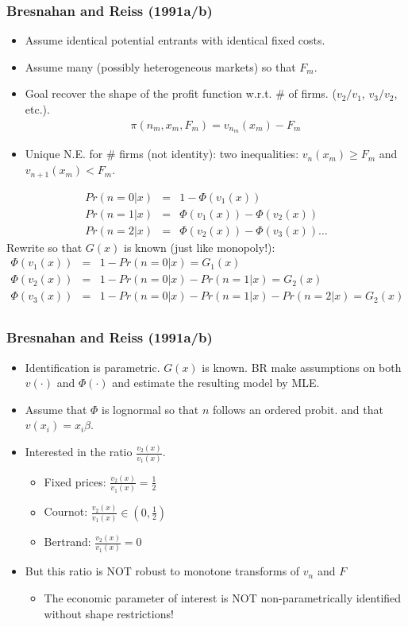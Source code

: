\documentclass[aspectratio=169,11pt]{beamer}
\begin{document}
\begin{frame}
\frametitle{Bresnahan and Reiss (1991a/b)}
\small
\begin{itemize}
\item Assume identical potential entrants with identical fixed costs.
\item Assume many (possibly heterogeneous markets) so that $F_m$.
\item Goal recover the shape of the profit function w.r.t. \# of firms. ($v_2/v_1$, $v_3/v_2$, etc.).
\begin{eqnarray*}
\pi(n_m, x_m, F_m) = v_{n_m} (x_m) - F_m
\end{eqnarray*}
\item Unique N.E. for \# firms (not identity): two inequalities: $v_{n}(x_m) \geq F_m$ and $v_{n+1}(x_m) < F_m$.
\end{itemize}
\begin{eqnarray*}
Pr(n=0 | x) &=& 1- \Phi(v_1(x))\\
Pr(n=1 | x) &=& \Phi(v_1(x))-\Phi(v_2(x))  \\
Pr(n=2 | x) &=& \Phi(v_2(x))-\Phi(v_3(x))  \ldots
\end{eqnarray*}
Rewrite so that $G(x)$ is known (just like monopoly!):
\begin{eqnarray*}
 \Phi(v_1(x)) &=& 1- Pr(n=0 | x) = G_1(x)\\
 \Phi(v_2(x)) &=& 1- Pr(n=0 | x)  - Pr(n=1 | x) = G_2(x)\\
 \Phi(v_3(x)) &=& 1- Pr(n=0 | x)  - Pr(n=1 | x) - Pr(n=2 | x) = G_2(x)\\
\end{eqnarray*}
\end{frame}

\begin{frame}
\frametitle{Bresnahan and Reiss (1991a/b)}
\small
\begin{itemize}
\item Identification is parametric. $G(x)$ is known. BR make assumptions on both $v(\cdot)$ and $\Phi(\cdot)$ and estimate the resulting model by MLE.
\item Assume that $\Phi$ is lognormal so that $n$ follows an ordered probit. and that $v(x_i) = x_i \beta$.
\item Interested in the ratio $\frac{v_2(x)}{v_1(x)}$.
\begin{itemize}
\item Fixed prices: $\frac{v_2(x)}{v_1(x)} = \frac{1}{2}$
\item Cournot: $\frac{v_2(x)}{v_1(x)} \in (0, \frac{1}{2})$
\item Bertrand: $\frac{v_2(x)}{v_1(x)} =0$
\end{itemize}
\item But this ratio is NOT robust to monotone transforms of $v_n$ and $F$
\begin{itemize}
\item The economic parameter of interest is NOT non-parametrically identified without shape restrictions!
\end{itemize}
\end{itemize}
\end{frame}
\end{document}
